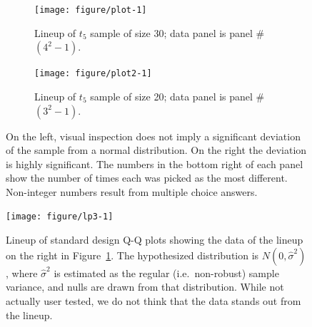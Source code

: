 \documentclass[12pt]{article}\usepackage[]{graphicx}\usepackage[]{color}
\newenvironment{knitrout}{}{} %
\newcommand{\hh}[1]{{\color{magenta} #1}}
\begin{document}
\begin{figure}[hbt]
\begin{subfigure}[t]{.49\textwidth}
\caption{Lineup of $t_5$ sample of size 30; data panel is panel \#$(4^2-1)$.}

\texttt{[image: figure/plot-1]} 


\end{subfigure}
\begin{subfigure}[t]{.49\textwidth}
\caption{Lineup of $t_5$ sample of size 20; data panel is panel \#$(3^2-1)$.}

\texttt{[image: figure/plot2-1]} 


\end{subfigure}
\caption{\label{fig:lpnorm}  On the left, visual inspection does not imply  a significant deviation of the sample from a normal distribution. On the right the deviation is highly significant. The numbers in the bottom right of each panel show the number of times each was picked as the most different. %
Non-integer numbers result from multiple choice answers. %
}
\end{figure}
\afterpage{\clearpage}

\begin{figure}
\centering
\begin{knitrout}
\color{fgcolor}
\texttt{[image: figure/lp3-1]} 

\end{knitrout}
\caption{\label{fig:lp3} Lineup of standard design Q-Q plots showing the data of the lineup on the right in Figure~\ref{fig:lpnorm}. The hypothesized distribution is $N(0, \widehat{\sigma}^2)$, where $\widehat{\sigma}^2$ is estimated as the regular (i.e.~non-robust) sample variance, and nulls are drawn from that distribution. While not actually user tested, we do not think that the data stands out from the lineup.}
\end{figure}
\afterpage{\clearpage}
\end{document}
